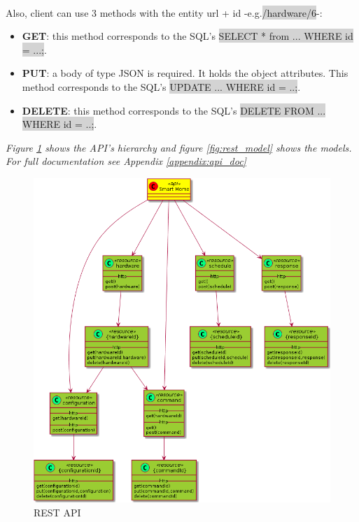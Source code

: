 \documentclass[12pt, oneside, a4paper]{book}
\newcommand{\code}[1]{{\color{red}\colorbox{lightgray}{#1}}}
\begin{document}
			 	\paragraph{}Also, client can use 3 methods with the entity url + id -e.g.\code{/hardware/6}-: 
			 	\begin{itemize}
			 		\item \textbf{GET}: this method corresponds to the SQL's \code{SELECT * from ... WHERE id = ...;}.
			 		\item \textbf{PUT}: a body of type JSON is required. It holds the object attributes. This method corresponds to the SQL's \code{UPDATE ... WHERE id = ..;}.
			 		\item \textbf{DELETE}: this method corresponds to the SQL's \code{DELETE FROM ... WHERE id = ..;}.
			 	\end{itemize} 
		 		\textit{Figure \ref{fig:rest} shows the API's hierarchy and figure \ref{fig:rest_model} shows the models. For full documentation see Appendix \ref{appendix:api_doc}}
				\begin{figure}[H]
					\caption{REST API}
					\label{fig:rest}
					\includegraphics[width=\linewidth]{img/rest_uml.png}
				\end{figure}
\end{document}
